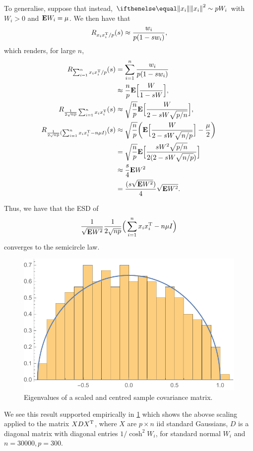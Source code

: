 \documentclass{hw-scrartcl}
\begin{document}
To generalise, suppose that instead, \(\norm{x_i}^2 \sim p W_i\) with \(W_i > 0\) and \(\mathbf{E} W_i = \mu\). We then have that
\[
  R_{x_i x_i^{\mathrm{T}}/p}(s)
  \approx \frac{w_i}{p(1 - s w_i)},
\]
which renders, for large \(n\),
\begin{align*}
  R_{\sum_{i=1}^n x_i x_i^{\mathrm{T}}/p}(s)
  &= \sum_{i=1}^n \frac{w_i}{p(1 - s w_i)} \\
  &\approx \frac{n}{p} \mathbf{E}\Big[\frac{W}{1 - sW}\Big], \\
  R_{\frac{1}{2\sqrt{np}}\sum_{i=1}^n x_i x_i^{\mathrm{T}}}(s)
  &\approx \sqrt{\frac{n}{p}}\mathbf{E}\Big[\frac{W}{2 - sW\sqrt{p/n}}\Big], \\
  R_{\frac{1}{2\sqrt{np}}(\sum_{i=1}^n x_i x_i^{\mathrm{T}} - n\mu I)}(s)
  &\approx \sqrt{\frac{n}{p}}\bigg(\mathbf{E}\Big[\frac{W}{2 - sW\sqrt{n/p}}\Big] - \frac{\mu}{2}\bigg) \\
  &= \sqrt{\frac{n}{p}} \mathbf{E}\Big[\frac{s W^2 \sqrt{p/n}}{2(2 - sW\sqrt{n/p})}\Big] \\
  &\approx \frac{s}{4} \mathbf{E} W^2 \\
  &= \frac{(s\sqrt{\mathbf{E} W^2})}{4} \sqrt{\mathbf{E} W^2}.
\end{align*}

Thus, we have that the ESD of
\[
  \frac{1}{\sqrt{\mathbf{E} W^2}} \frac{1}{2\sqrt{np}}\Big(\sum_{i=1}^n x_i x_i^{\mathrm{T}} - n\mu I\Big)
\]
converges to the semicircle law.

\begin{figure}
  \centering
  \includegraphics[width=\linewidth]{figures/corr-covmat-eigenvalues}
  \caption{Eigenvalues of a scaled and centred sample covariance matrix.}
  \label{fig:covmat-eig}
\end{figure}

We see this result supported empirically in \cref{fig:covmat-eig} which shows the abovse scaling applied to the matrix \(X D X^{\mathrm{T}}\), where \(X\) are \(p\times n\) iid standard Gaussians, \(D\) is a diagonal matrix with diagonal entries \(1/\cosh^2 W_i\), for standard normal \(W_i\) and \(n = 30000, p = 300\).
\end{document}
